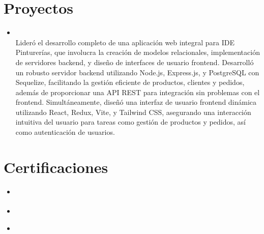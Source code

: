 \documentclass[]{rahulworld-resume}
\begin{document}
\begin{minipage}[t]{0.66\textwidth}
    \section{Proyectos}

    \begin{itemize}
        \item
              \\Lideró el desarrollo completo de una
              aplicación web integral para IDE Pinturerías, que involucra la creación de
              modelos relacionales, implementación de servidores backend, y diseño de
              interfaces de usuario frontend. Desarrolló un robusto servidor backend
              utilizando Node.js, Express.js, y PostgreSQL con Sequelize,
              facilitando la gestión eficiente de productos, clientes y
              pedidos, además de proporcionar una API REST para integración sin problemas
              con el frontend. Simultáneamente, diseñó una interfaz de usuario frontend
              dinámica utilizando React, Redux, Vite, y Tailwind CSS, asegurando una
              interacción intuitiva del usuario para tareas como gestión de productos
              y pedidos, así como autenticación de usuarios.

    \end{itemize}

    \section{Certificaciones}

    \begin{itemize}
        \item \href{https://www.freecodecamp.org/certification/jamerrq/foundational-c-sharp-with-microsoft}{}

        \item
              \href{https://www.freecodecamp.org/certification/jamerrq/legacy-javascript-algorithms-and-data-structures}{}\\

        \item
              \href{https://www.freecodecamp.org/certification/jamerrq/responsive-web-design}{}\\

    \end{itemize}
\end{minipage}
\end{document}

